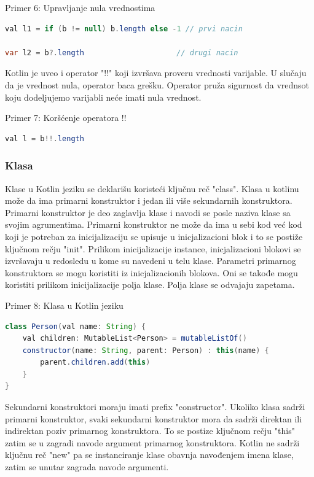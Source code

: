 \documentclass[12pt,oneside]{memoir}
\begin{document}
\begin{center} Primer 6: Upravljanje nula vrednostima\end{center}
\begin{lstlisting}[language=Java]
val l1 = if (b != null) b.length else -1 // prvi nacin
 
var l2 = b?.length                     // drugi nacin
\end{lstlisting}
 
Kotlin je uveo i operator "!!" koji izvršava proveru vrednosti varijable. U slučaju da je vrednost nula, operator baca grešku. Operator pruža sigurnost da vrednsot koju dodeljujemo varijabli neće imati nula vrednost.
 
\begin{center} Primer 7: Koršćenje operatora !!\end{center}
\begin{lstlisting}[language=Java]
val l = b!!.length
\end{lstlisting}
 
\subsubsection{Klasa}
Klase u Kotlin jeziku se deklarišu koristeći ključnu reč "class". Klasa u kotlinu može da ima primarni konstruktor i jedan ili više sekundarnih konstruktora. Primarni konstruktor je deo zaglavlja klase i navodi se posle naziva klase sa svojim agrumentima. Primarni konstruktor ne može da ima u sebi kod već kod koji je potreban za inicijalizaciju se upisuje u inicjalizacioni blok i to se postiže ključnom rečju "init". Prilikom inicijalizacije instance, inicjalizacioni blokovi se izvršavaju u redosledu u kome su navedeni u telu klase. Parametri primarnog konstruktora se mogu koristiti iz inicjalizacionih blokova. Oni se takođe mogu koristiti prilikom inicijalizacije polja klase. Polja klase se odvajaju zapetama. 
 
\begin{center} Primer 8: Klasa u Kotlin jeziku\end{center}
\begin{lstlisting}[language=Java]
class Person(val name: String) {
    val children: MutableList<Person> = mutableListOf()
    constructor(name: String, parent: Person) : this(name) {
        parent.children.add(this)
    }
}
\end{lstlisting}
 
Sekundarni konstruktori moraju imati prefix "constructor". Ukoliko klasa sadrži primarni konstruktor, svaki sekundarni konstruktor mora da sadrži direktan ili indirektan poziv primarnog konstruktora. To se postize ključnom rečju "this" zatim se u zagradi navode argument primarnog konstruktora. Kotlin ne sadrži ključnu reč "new" pa se instanciranje klase obavnja navođenjem imena klase, zatim se unutar zagrada navode argumenti.
 
\end{document}
